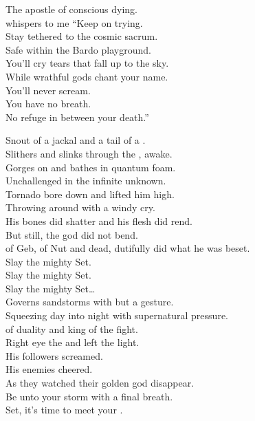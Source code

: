 The apostle of conscious dying. \\
whispers to me ``Keep on trying. \\
Stay tethered to the cosmic sacrum. \\
Safe within the Bardo playground. \\
You'll cry tears that fall up to the sky. \\
While wrathful gods chant your name. \\
You'll never scream. \\
You have no breath. \\
No refuge in between your death.'' \\



Snout of a jackal and a tail of a . \\
Slithers and slinks through the , awake. \\
Gorges on  and bathes in quantum foam. \\
Unchallenged in the infinite unknown. \\

Tornado bore down and lifted him high. \\
Throwing  around with a windy cry. \\
His bones did shatter and his flesh did rend. \\
But still, the god did not bend. \\

 of Geb, of Nut and dead, dutifully did what he was beset. \\

Slay the mighty Set. \\
Slay the mighty Set. \\
Slay the mighty Set… \\

Governs sandstorms with but a gesture. \\
Squeezing day into night with supernatural pressure. \\
 of duality and king of the fight. \\
Right eye the  and left the  light. \\
His followers screamed. \\
His enemies cheered. \\
As they watched their golden god disappear. \\
Be unto your storm with a final breath. \\
Set, it's time to meet your . \\

